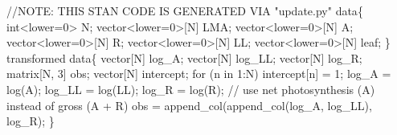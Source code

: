 \documentclass[
  12pt,
  letterpaper,
  DIV=11,
  numbers=noendperiod]{scrartcl}
\newenvironment{Shaded}{\begin{snugshade}}{\end{snugshade}}
\newcommand{\AlertTok}[1]{\textcolor[rgb]{0.68,0.00,0.00}{#1}}
\newcommand{\CommentTok}[1]{\textcolor[rgb]{0.37,0.37,0.37}{#1}}
\newcommand{\ControlFlowTok}[1]{\textcolor[rgb]{0.00,0.23,0.31}{#1}}
\newcommand{\DataTypeTok}[1]{\textcolor[rgb]{0.68,0.00,0.00}{#1}}
\newcommand{\DecValTok}[1]{\textcolor[rgb]{0.68,0.00,0.00}{#1}}
\newcommand{\KeywordTok}[1]{\textcolor[rgb]{0.00,0.23,0.31}{#1}}
\newcommand{\NormalTok}[1]{\textcolor[rgb]{0.00,0.23,0.31}{#1}}
\begin{document}
\begin{Shaded}
\begin{Highlighting}[]
\CommentTok{//}\AlertTok{NOTE}\CommentTok{: THIS STAN CODE IS GENERATED VIA "update.py"}
\KeywordTok{data}\NormalTok{\{}
  \DataTypeTok{int}\NormalTok{\textless{}}\KeywordTok{lower}\NormalTok{=}\DecValTok{0}\NormalTok{\textgreater{} N;}
  \DataTypeTok{vector}\NormalTok{\textless{}}\KeywordTok{lower}\NormalTok{=}\DecValTok{0}\NormalTok{\textgreater{}[N] LMA;}
  \DataTypeTok{vector}\NormalTok{\textless{}}\KeywordTok{lower}\NormalTok{=}\DecValTok{0}\NormalTok{\textgreater{}[N] A;}
  \DataTypeTok{vector}\NormalTok{\textless{}}\KeywordTok{lower}\NormalTok{=}\DecValTok{0}\NormalTok{\textgreater{}[N] R;}
  \DataTypeTok{vector}\NormalTok{\textless{}}\KeywordTok{lower}\NormalTok{=}\DecValTok{0}\NormalTok{\textgreater{}[N] LL;}
  \DataTypeTok{vector}\NormalTok{\textless{}}\KeywordTok{lower}\NormalTok{=}\DecValTok{0}\NormalTok{\textgreater{}[N] leaf;}
\NormalTok{\}}
\KeywordTok{transformed data}\NormalTok{\{}
  \DataTypeTok{vector}\NormalTok{[N] log\_A;}
  \DataTypeTok{vector}\NormalTok{[N] log\_LL;}
  \DataTypeTok{vector}\NormalTok{[N] log\_R;}
  \DataTypeTok{matrix}\NormalTok{[N, }\DecValTok{3}\NormalTok{] obs;}
  \DataTypeTok{vector}\NormalTok{[N] intercept;}
  \ControlFlowTok{for}\NormalTok{ (n }\ControlFlowTok{in} \DecValTok{1}\NormalTok{:N)}
\NormalTok{    intercept[n] = }\DecValTok{1}\NormalTok{;}
\NormalTok{  log\_A = log(A);}
\NormalTok{  log\_LL = log(LL);}
\NormalTok{  log\_R = log(R);}
  \CommentTok{// use net photosynthesis (A) instead of gross (A + R)}
\NormalTok{  obs = append\_col(append\_col(log\_A, log\_LL), log\_R);}
\NormalTok{\}}


\end{Highlighting}
\end{Shaded}
\end{document}
